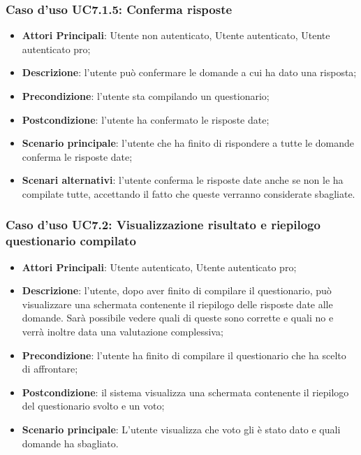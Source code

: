 \subsubsection{Caso d'uso UC7.1.5: Conferma risposte}
\label{UC7.1.5}
\begin{itemize}
\item\textbf{Attori Principali}: Utente non autenticato, Utente autenticato, Utente autenticato pro;
\item\textbf{Descrizione}: l'utente può confermare le domande a cui ha dato una risposta;
\item\textbf{Precondizione}: l'utente sta compilando un questionario;
\item\textbf{Postcondizione}: l'utente ha confermato le risposte date;
\item\textbf{Scenario principale}: l'utente che ha finito di rispondere a tutte le domande conferma le risposte date;
\item\textbf{Scenari alternativi}: l'utente conferma le risposte date anche se non le ha compilate tutte, accettando il fatto che queste verranno considerate sbagliate.
\end{itemize}

\subsubsection{Caso d'uso UC7.2: Visualizzazione risultato e riepilogo questionario compilato}
\label{UC7.2}
\begin{itemize}
\item\textbf{Attori Principali}: Utente autenticato, Utente autenticato pro;
\item\textbf{Descrizione}: l'utente, dopo aver finito di compilare il questionario, può visualizzare una schermata contenente il riepilogo delle risposte date alle domande. Sarà possibile vedere quali di queste sono corrette e quali no e verrà inoltre data una valutazione complessiva;
\item\textbf{Precondizione}: l'utente ha finito di compilare il questionario che ha scelto di affrontare;
\item\textbf{Postcondizione}: il sistema visualizza una schermata contenente il riepilogo del questionario svolto e un voto;
\item\textbf{Scenario principale}: L'utente visualizza che voto gli è stato dato e quali domande ha sbagliato.
\end{itemize}

